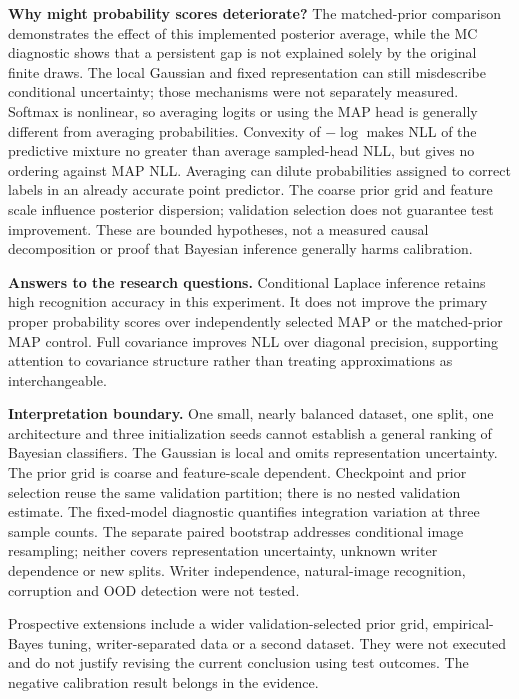 \documentclass[10pt,a4paper]{article}
\begin{document}
\textbf{Why might probability scores deteriorate?}
The matched-prior comparison demonstrates the effect of this implemented
posterior average, while the MC diagnostic shows that a persistent gap is not
explained solely by the original finite draws. The local Gaussian and fixed
representation can still misdescribe conditional uncertainty; those mechanisms
were not separately measured. Softmax is nonlinear, so averaging logits or using
the MAP head is generally different from averaging probabilities. Convexity of
$-\log$ makes NLL of the predictive mixture no greater than average sampled-head
NLL, but gives no ordering against MAP NLL. Averaging can dilute probabilities
assigned to correct labels in an already accurate point predictor. The coarse
prior grid and feature scale influence posterior dispersion; validation selection
does not guarantee test improvement. These are bounded hypotheses, not a measured
causal decomposition or proof that Bayesian inference generally harms calibration.

\textbf{Answers to the research questions.} Conditional Laplace inference
retains high recognition accuracy in this experiment. It does not improve
the primary proper probability scores over independently selected MAP or the
matched-prior MAP control. Full covariance improves NLL over diagonal precision,
supporting attention to covariance structure rather than treating approximations
as interchangeable.

\textbf{Interpretation boundary.} One small, nearly balanced dataset, one split,
one architecture and three initialization seeds cannot establish a general
ranking of Bayesian classifiers. The Gaussian is local and omits representation
uncertainty. The prior grid is coarse and feature-scale dependent. Checkpoint
and prior selection reuse the same validation partition; there is no nested
validation estimate. The fixed-model diagnostic quantifies integration variation at three sample
counts. The separate paired bootstrap addresses conditional image resampling;
neither covers representation uncertainty, unknown writer dependence or new splits.
Writer independence, natural-image recognition, corruption and OOD detection
were not tested.

Prospective extensions include a wider validation-selected prior grid,
empirical-Bayes tuning, writer-separated
data or a second dataset. They were not executed and do not justify revising
the current conclusion using test outcomes. The negative calibration result
belongs in the evidence.
\end{document}
